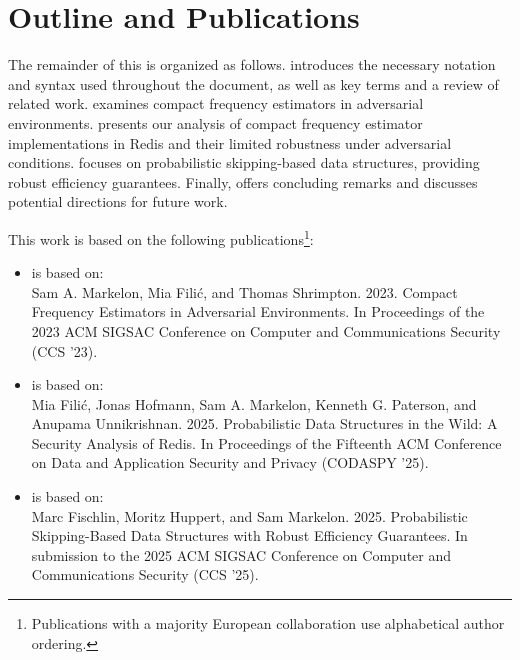 \section{Outline and Publications}

The remainder of this  is organized as follows.  introduces the necessary notation and syntax used throughout the document, as well as key terms and a review of related work.  examines compact frequency estimators in adversarial environments.  presents our analysis of compact frequency estimator implementations in Redis and their limited robustness under adversarial conditions.  focuses on probabilistic skipping-based data structures, providing robust efficiency guarantees. Finally,  offers concluding remarks and discusses potential directions for future work.

This work is based on the following publications\footnote{Publications with a majority European collaboration use alphabetical author ordering.}:

\begin{itemize}
    \item {} is based on:\\
    Sam A. Markelon, Mia Filić, and Thomas Shrimpton. 2023. Compact Frequency Estimators in Adversarial Environments. In Proceedings of the 2023 ACM SIGSAC Conference on Computer and Communications Security (CCS '23).

    \item {} is based on:\\
    Mia Filić, Jonas Hofmann, Sam A. Markelon, Kenneth G. Paterson, and Anupama Unnikrishnan. 2025. Probabilistic Data Structures in the Wild: A Security Analysis of Redis. In Proceedings of the Fifteenth ACM Conference on Data and Application Security and Privacy (CODASPY '25).

    \item {} is based on:\\
    Marc Fischlin, Moritz Huppert, and Sam Markelon. 2025. Probabilistic Skipping-Based Data Structures with Robust Efficiency Guarantees. In submission to the 2025 ACM SIGSAC Conference on Computer and Communications Security (CCS '25).
\end{itemize}